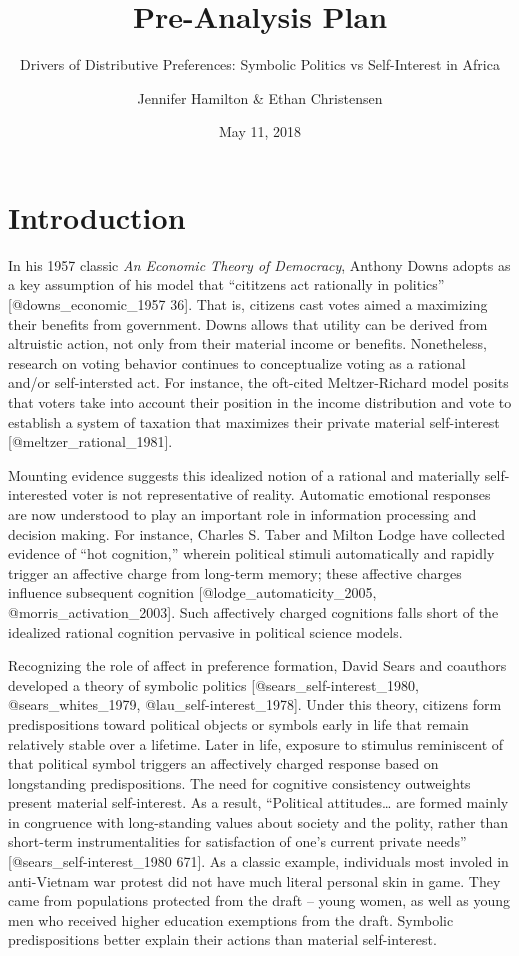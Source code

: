 \documentclass[]{article}
\title{Pre-Analysis Plan}
\subtitle{Drivers of Distributive Preferences: Symbolic Politics vs Self-Interest
in Africa}
\author{Jennifer Hamilton \& Ethan Christensen}
\date{May 11, 2018}
\begin{document}
\maketitle

\section{Introduction}\label{introduction}

In his 1957 classic \textit{An Economic Theory of Democracy}, Anthony
Downs adopts as a key assumption of his model that ``cititzens act
rationally in politics'' {[}@downs\_economic\_1957 36{]}. That is,
citizens cast votes aimed a maximizing their benefits from government.
Downs allows that utility can be derived from altruistic action, not
only from their material income or benefits. Nonetheless, research on
voting behavior continues to conceptualize voting as a rational and/or
self-intersted act. For instance, the oft-cited Meltzer-Richard model
posits that voters take into account their position in the income
distribution and vote to establish a system of taxation that maximizes
their private material self-interest {[}@meltzer\_rational\_1981{]}.

Mounting evidence suggests this idealized notion of a rational and
materially self-interested voter is not representative of reality.
Automatic emotional responses are now understood to play an important
role in information processing and decision making. For instance,
Charles S. Taber and Milton Lodge have collected evidence of ``hot
cognition,'' wherein political stimuli automatically and rapidly trigger
an affective charge from long-term memory; these affective charges
influence subsequent cognition {[}@lodge\_automaticity\_2005,
@morris\_activation\_2003{]}. Such affectively charged cognitions falls
short of the idealized rational cognition pervasive in political science
models.

Recognizing the role of affect in preference formation, David Sears and
coauthors developed a theory of symbolic politics
{[}@sears\_self-interest\_1980, @sears\_whites\_1979,
@lau\_self-interest\_1978{]}. Under this theory, citizens form
predispositions toward political objects or symbols early in life that
remain relatively stable over a lifetime. Later in life, exposure to
stimulus reminiscent of that political symbol triggers an affectively
charged response based on longstanding predispositions. The need for
cognitive consistency outweights present material self-interest. As a
result, ``Political attitudes\ldots{} are formed mainly in congruence
with long-standing values about society and the polity, rather than
short-term instrumentalities for satisfaction of one's current private
needs'' {[}@sears\_self-interest\_1980 671{]}. As a classic example,
individuals most involed in anti-Vietnam war protest did not have much
literal personal skin in game. They came from populations protected from
the draft -- young women, as well as young men who received higher
education exemptions from the draft. Symbolic predispositions better
explain their actions than material self-interest.
\end{document}
